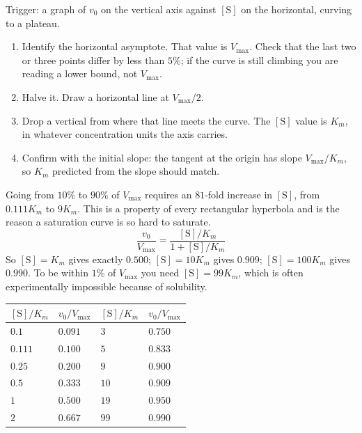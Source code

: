 \begin{tipbox}[title={TECHNIQUE: extracting $V_{\max}$ and $K_m$ from a saturation curve}]
Trigger: a graph of $v_0$ on the vertical axis against $[\mathrm{S}]$ on the horizontal,
curving to a plateau.
\begin{enumerate}
\item Identify the horizontal asymptote. That value is $V_{\max}$. Check that the last
two or three points differ by less than $5\%$; if the curve is still climbing you are
reading a lower bound, not $V_{\max}$.
\item Halve it. Draw a horizontal line at $V_{\max}/2$.
\item Drop a vertical from where that line meets the curve. The $[\mathrm{S}]$ value is
$K_m$, in whatever concentration units the axis carries.
\item Confirm with the initial slope: the tangent at the origin has slope
$V_{\max}/K_m$, so $K_m$ predicted from the slope should match.
\end{enumerate}
\end{tipbox}

\begin{keybox}[title={MEMORIZE: the $81$-fold rule and the saturation table}]
Going from $10\%$ to $90\%$ of $V_{\max}$ requires an $81$-fold increase in
$[\mathrm{S}]$, from $0.111K_m$ to $9K_m$. This is a property of every rectangular
hyperbola and is the reason a saturation curve is so hard to saturate.
\[
\frac{v_0}{V_{\max}}=\frac{[\mathrm{S}]/K_m}{1+[\mathrm{S}]/K_m}
\]
So $[\mathrm{S}]=K_m$ gives exactly $0.500$; $[\mathrm{S}]=10K_m$ gives $0.909$;
$[\mathrm{S}]=100K_m$ gives $0.990$. To be within $1\%$ of $V_{\max}$ you need
$[\mathrm{S}]=99K_m$, which is often experimentally impossible because of solubility.
\end{keybox}

\begin{tabular}{@{}llll@{}}
\toprule
$[\mathrm{S}]/K_m$ & $v_0/V_{\max}$ & $[\mathrm{S}]/K_m$ & $v_0/V_{\max}$\\
\midrule
$0.1$ & $0.091$ & $3$ & $0.750$\\
$0.111$ & $0.100$ & $5$ & $0.833$\\
$0.25$ & $0.200$ & $9$ & $0.900$\\
$0.5$ & $0.333$ & $10$ & $0.909$\\
$1$ & $0.500$ & $19$ & $0.950$\\
$2$ & $0.667$ & $99$ & $0.990$\\
\bottomrule
\end{tabular}

